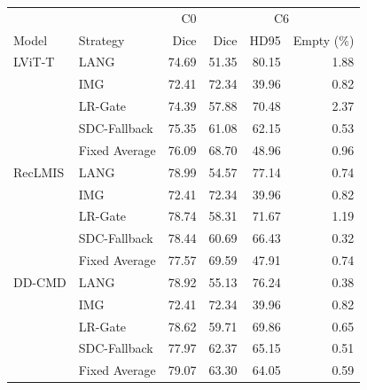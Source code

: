 \begin{tabular}{llrrrr}
\hline
 & & C0 & \multicolumn{3}{c}{C6} \\
Model & Strategy & Dice & Dice & HD95 & Empty (\%) \\
\hline
LViT-T & LANG & 74.69 & 51.35 & 80.15 & 1.88 \\
 & IMG & 72.41 & 72.34 & 39.96 & 0.82 \\
 & LR-Gate & 74.39 & 57.88 & 70.48 & 2.37 \\
 & SDC-Fallback & 75.35 & 61.08 & 62.15 & 0.53 \\
 & Fixed Average & 76.09 & 68.70 & 48.96 & 0.96 \\
\hline
RecLMIS & LANG & 78.99 & 54.57 & 77.14 & 0.74 \\
 & IMG & 72.41 & 72.34 & 39.96 & 0.82 \\
 & LR-Gate & 78.74 & 58.31 & 71.67 & 1.19 \\
 & SDC-Fallback & 78.44 & 60.69 & 66.43 & 0.32 \\
 & Fixed Average & 77.57 & 69.59 & 47.91 & 0.74 \\
\hline
DD-CMD & LANG & 78.92 & 55.13 & 76.24 & 0.38 \\
 & IMG & 72.41 & 72.34 & 39.96 & 0.82 \\
 & LR-Gate & 78.62 & 59.71 & 69.86 & 0.65 \\
 & SDC-Fallback & 77.97 & 62.37 & 65.15 & 0.51 \\
 & Fixed Average & 79.07 & 63.30 & 64.05 & 0.59 \\
\hline
\end{tabular}
